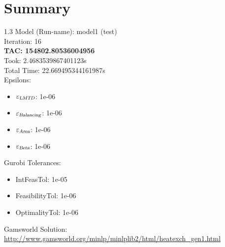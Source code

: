 \documentclass{article}%
\begin{document}
%
\normalsize%
\section{Summary}%
\thispagestyle{plain}%
\begin{spacing}{1.3}%
\Large%
Model (Run-name): model1 (test)\\%
Iteration: 16\\%
\textbf{TAC: 154802.80536004956}\\%
Took: 2.4683539867401123s\\%
Total Time: 22.669495344161987s\\%
Epsilons:%
\begin{itemize}%
	\item $\varepsilon_{\textsl{LMTD}}$: 1e-06%
	\item $\varepsilon_{\textsl{Balancing}}$: 1e-06%
	\item $\varepsilon_{\textsl{Area}}$: 1e-06%
	\item $\varepsilon_{\textsl{Beta}}$: 1e-06%
\end{itemize}%
Gurobi Tolerances:%
\begin{itemize}%
	\item IntFeasTol: 1e-05%
	\item FeasibilityTol: 1e-06%
	\item OptimalityTol: 1e-06%
\end{itemize}%
\end{spacing}%
\normalsize%
Gamsworld Solution: \url{http://www.gamsworld.org/minlp/minlplib2/html/heatexch_gen1.html}%
%
\clearpage%
\end{document}
